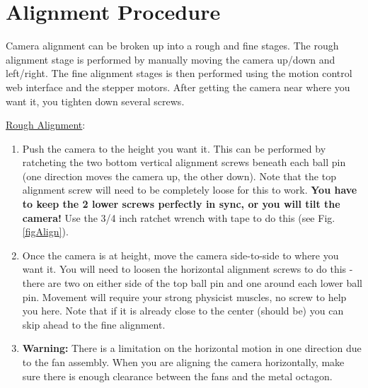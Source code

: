 \documentclass[11pt]{article}
\begin{document}
\section{Alignment Procedure}
\label{alignSec}

Camera alignment can be broken up into a rough and fine stages.
The rough alignment stage is performed by manually moving the camera up/down and left/right.
The fine alignment stages is then performed using the motion control web interface and the stepper motors.
After getting the camera near where you want it, you tighten down several screws.

\underline{Rough Alignment}:
\begin{enumerate}
	\item Push the camera to the height you want it.  
		This can be performed by ratcheting the two bottom vertical alignment screws beneath each ball pin (one direction moves the camera up, the other down).
		Note that the top alignment screw will need to be completely loose for this to work. 
		{\bf You have to keep the 2 lower screws perfectly in sync, or you will tilt the camera!}
		Use the 3/4 inch ratchet wrench with tape to do this (see Fig. \ref{figAlign}).
	\item Once the camera is at height, move the camera side-to-side to where you want it.
		You will need to loosen the horizontal alignment screws to do this - there are two on either side of the top ball pin and one around each lower ball pin.
		Movement will require your strong physicist muscles, no screw to help you here.
		Note that if it is already close to the center (should be) you can skip ahead to the fine alignment.
	\item {\bf Warning: }  There is a limitation on the horizontal motion in one direction due to the fan assembly.  
		When you are aligning the camera horizontally, make sure there is enough clearance between the fans and the metal octagon.
\end{enumerate}
\end{document}
